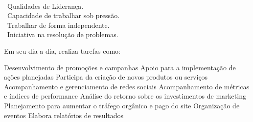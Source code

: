


\hfill \faUserFriends {}\\
\hfill \faBalanceScale {}\\
\hfill \faChess {}\\
\hfill \faUsersCog {}\\
\hfill \faCogs {}\\
\hfill \faDiagnoses {}\\
\hfill \faUsers {}

\begin{commentA} \vspace{0.3cm} \noindent 
\vspace{8px}

\faMedal ~Qualidades de Liderança.\\ \vspace{3px}
\faItchIo ~Capacidade de trabalhar sob pressão. \\ \vspace{3px}
\faLaptopHouse ~Trabalhar de forma independente. \\ \vspace{3px}
\faChalkboardTeacher ~Iniciativa na resolução de problemas. \\ \vspace{3px}
 \par \vspace{0.1cm} \end{commentA}


\begin{commentA} \vspace{0.3cm} \noindent 
Em seu dia a dia, realiza tarefas como:

Desenvolvimento de promoções e campanhas
Apoio para a implementação de ações planejadas
Participa da criação de novos produtos ou serviços
Acompanhamento e gerenciamento de redes sociais
Acompanhamento de métricas e índices de performance
Análise do retorno sobre os investimentos de marketing
Planejamento para aumentar o tráfego orgânico e pago do site
Organização de eventos
Elabora relatórios de resultados
 \par \vspace{0.1cm} \end{commentA}


